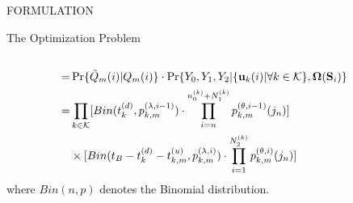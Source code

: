 \documentclass[10pt, conference, letterpaper]{IEEEtran}
\renewcommand{\vec}{\mathbf}
\DeclarePairedDelimiter{\set}{\{}{\}}
\newcommand{\apSet}{\mathcal{K}}
\newcommand{\Stat}{\mathbf{S}}
\newcommand{\Policy}{\mathbf{\Omega}}
\begin{document}
\begin{section}{FORMULATION}
\begin{subsection}{The Optimization Problem}
\begin{align}
                \nonumber\\
                =& \Pr\{\tilde{Q}_m(i)|Q_m(i)\} \cdot \Pr\{Y_0, Y_1, Y_2|\set{\vec{u}_k(i)|\forall k\in\apSet}, \Policy(\Stat_i)\}
                \nonumber\\
                =& \prod_{k\in\apSet} [Bin(t^{(d)}_k, p^{(\lambda, i-1)}_{k,m}) \cdot \prod_{i=n}^{n^{(k)}_0 + N^{(k)}_1} p^{(\theta, i-1)}_{k,m}(j_n)]
                \nonumber\\
                & \times [Bin(t_B-t^{(d)}_k-t^{(u)}_{k,m}, p^{(\lambda, i)}_{k,m}) \cdot \prod_{i=1}^{N^{(k)}_2} p^{(\theta, i)}_{k,m}(j_n)]
            \end{align}
            where $Bin(n,p)$ denotes the Binomial distribution.
        \end{subsection}
    \end{section}
\end{document}
